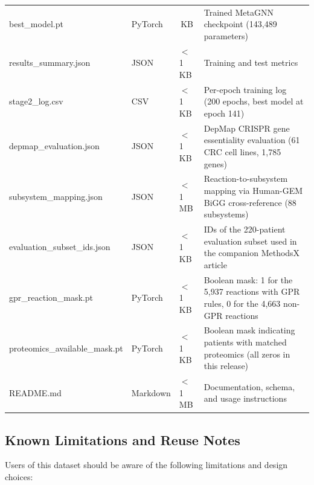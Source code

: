 \documentclass[12pt,a4paper]{article}
\begin{document}
\begin{table}[!htbp]
\begin{tabularx}{\textwidth}{@{}>{\raggedright\arraybackslash\ttfamily}p{3.5cm}>{\raggedright\arraybackslash}p{1.3cm}>{\raggedright\arraybackslash}p{1.0cm}X@{}}
best\_model.pt & PyTorch & 576\,KB & Trained MetaGNN checkpoint (143,489 parameters) \\
results\_summary.json & JSON & $<$1\,KB & Training and test metrics \\
stage2\_log.csv & CSV & $<$1\,KB & Per-epoch training log (200 epochs, best model at epoch 141) \\
depmap\_evaluation.json & JSON & $<$1\,KB & DepMap CRISPR gene essentiality evaluation (61 CRC cell lines, 1,785 genes) \\
subsystem\_mapping.json & JSON & $<$1\,MB & Reaction-to-subsystem mapping via Human-GEM BiGG cross-reference (88 subsystems) \\
evaluation\_subset\_\allowbreak{}ids.json & JSON & $<$1\,KB & IDs of the 220-patient evaluation subset used in the companion MethodsX article \\
gpr\_reaction\_\allowbreak{}mask.pt & PyTorch & $<$1\,KB & Boolean mask: 1 for the 5,937 reactions with GPR rules, 0 for the 4,663 non-GPR reactions \\
proteomics\_available\_\allowbreak{}mask.pt & PyTorch & $<$1\,KB & Boolean mask indicating patients with matched proteomics (all zeros in this release) \\
README.md & Markdown & $<$1\,MB & Documentation, schema, and usage instructions \\
\bottomrule
\end{tabularx}
\end{table}

\subsection{Known Limitations and Reuse Notes}
\label{sec:limitations}

Users of this dataset should be aware of the following limitations and design choices:
\end{document}
